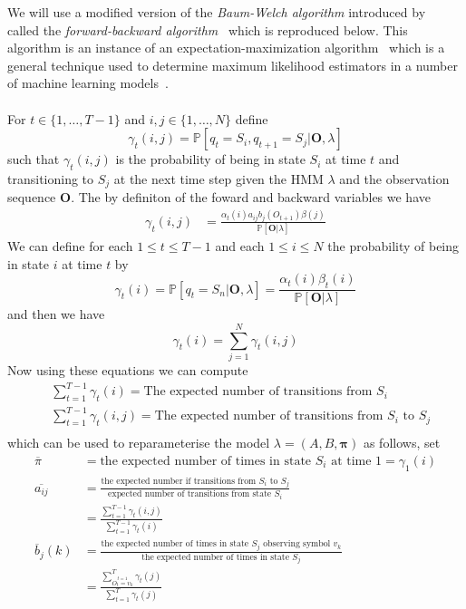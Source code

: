 We will use a modified version of the \emph{Baum-Welch algorithm} introduced by~\citet{baum1970maximization} called the \emph{forward-backward algorithm}~\citep{rabiner1989tutorial} which is reproduced below. This algorithm is an instance of an expectation-maximization algorithm~\cite{moon1996expectation} which is a general technique used to determine maximum likelihood estimators in a number of machine learning models~\cite{bishop2006pattern}. \\
\\
For $t \in \{1, \dots, T-1\}$ and $i,j \in \{1, \dots, N\}$ define
\begin{equation*}
\gamma_t(i,j) = \mathbb{P}[q_t = S_i, q_{t+1}=S_j| \bm{O}, \lambda]
\end{equation*}
such that $\gamma_t(i,j)$ is the probability of being in state $S_i$ at time $t$ and transitioning to $S_j$ at the next time step given the HMM $\lambda$ and the observation sequence $\bm{O}$. The by definiton of the foward and backward variables we have
\begin{align*}
\gamma_t(i,j) &= \frac{\alpha_t(i)a_{ij}b_j(O_{t+1})\beta(j)}{\mathbb{P}[\bm{O}|\lambda]}	
\end{align*}
We can define for each $1 \leq t \leq T-1$ and each $1 \leq i \leq N$ the probability of being in state $i$ at time $t$ by
\begin{equation*}
\gamma_t(i) = \mathbb{P}[q_t = S_n | \bm{O}, \lambda] = \frac{\alpha_t(i)\beta_t(i)}{\mathbb{P}[\bm{O}|\lambda]}
\end{equation*}
and then we have
\begin{equation*}
\gamma_t(i) = \sum_{j=1}^N \gamma_t(i,j)
\end{equation*}
Now using these equations we can compute
\begin{align*}
&\sum_{t=1}^{T-1} \gamma_t(i) = \text{The expected number of transitions from $S_i$} \\
&\sum_{t=1}^{T-1} \gamma_t(i,j) =  \text{The expected number of transitions from $S_i$ to $S_j$}\\
\end{align*}
which can be used to reparameterise the model $\lambda = (A,B,\bm{\pi})$ as follows, set
\begin{align*}
\overline{\pi} &= \text{the expected number of times in state $S_i$ at time $1$} = \gamma_1(i) \\
\overline{a_{ij}} &= \frac{\text{the expected number if transitions from $S_i$ to $S_j$}}{\text{expected number of transitions from state $S_i$}} \\ 
				&= \frac{\sum_{t=1}^{T-1} \gamma_t(i,j)}{\sum_{t=1}^{T-1} \gamma_t(i)} \\
\overline{b}_j(k) &= \frac{\text{the expected number of times in state $S_j$ observing symbol $v_k$}}{\text{the expected number of times in state $S_j$}} \\
				&=\frac{\sum_{\stackrel{t=1}{O_t=v_k}}^{T}\gamma_t(j)}{\sum_{t=1}^T \gamma_t(j)}
\end{align*}
